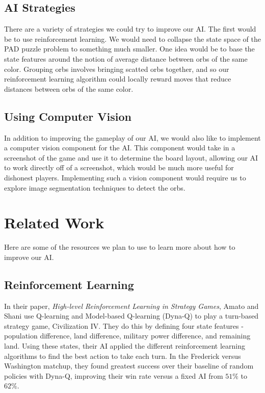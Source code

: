 \documentclass[journal,final,letterpaper,11pt]{IEEEtran}
\begin{document}
\subsection{AI Strategies}
There are a variety of strategies we could try to improve our AI. The first would be to use reinforcement learning. We would need to collapse the state space of the PAD puzzle problem to something much smaller. One idea would be to base the state features around the notion of average distance between orbs of the same color. Grouping orbs involves bringing scatted orbs together, and so our reinforcement learning algorithm could locally reward moves that reduce distances between orbs of the same color.
\vspace*{-0.15in}
\subsection{Using Computer Vision}
In addition to improving the gameplay of our AI, we would also like to implement a computer vision component for the AI. This component would take in a screenshot of the game and use it to determine the board layout, allowing our AI to work directly off of a screenshot, which would be much more useful for dishonest players. Implementing such a vision component would require us to explore image segmentation techniques to detect the orbs.

\section{Related Work}
Here are some of the resources we plan to use to learn more about how to improve our AI.

\subsection{Reinforcement Learning}
In their paper, \textit{High-level Reinforcement Learning in Strategy Games}, Amato and Shani use Q-learning and Model-based Q-learning (Dyna-Q) to play a turn-based strategy game, Civilization IV. They do this by defining four state features - population difference, land difference, military power difference, and remaining land. Using these states, their AI applied the different reinforcement learning algorithms to find the best action to take each turn. In the Frederick versus Washington matchup, they found greatest success over their baseline of random policies with Dyna-Q, improving their win rate versus a fixed AI from $51\%$ to $62\%$.
\end{document}

